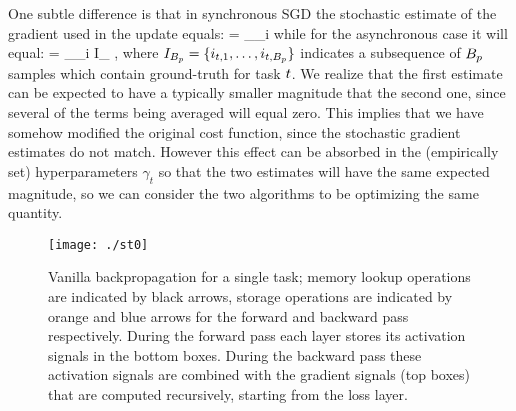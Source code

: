 \documentclass[10pt,twocolumn,letterpaper]{article}
\begin{document}
One subtle difference is that in synchronous SGD the stochastic estimate of the gradient used in the update equals:
\ba
{} = \gamma_{\task}\sum_{i \in \mb} \mydelta{\task}{\bi} \lossdd{\task}{\prd{\task}{\bi}(\prm{\cnn},\prm{\task})}{\gt{\task}{\bi}}{\prm{\mathrm{\task}}}\ea
while for the asynchronous case it will equal:
\ba
{} =
\gamma_{\task}\sum_{i \in I_{\bstask}}  \lossdd{\task}{\prd{\task}{\bi}(\prm{\cnn},\prm{\task})}{\gt{\task}{\bi}}{\prm{\mathrm{\task}}},\ea
where $I_{B_{p}} =\{i_{t,1},\ldots,i_{t,B_{p}}\}$ indicates a subsequence of $B_{p}$ samples which contain ground-truth for task $t$. We realize that the first estimate can be expected to have a typically smaller magnitude that the second one, since several of the terms being averaged will equal zero. This implies that we have somehow modified the original cost function, since the stochastic gradient estimates do not match.
However this effect can be absorbed in the (empirically set) hyperparameters $\gamma_t$ so that the two estimates will have the same expected magnitude, so we can consider the two algorithms to be optimizing the same quantity.  











\newcommand{\nlcnn}{L_{C}}
\newcommand{\nltask}{L_{T}}
\newcommand{\nbytes}{N}

\newcommand{\wdf}{.5\textwidth}
\begin{figure}[!h]
	\begin{center}
		\texttt{[image: ./st0]}
	\end{center}
	\caption{Vanilla backpropagation for a single task; memory lookup operations are indicated by black arrows, storage operations are indicated by orange and blue arrows for the forward and backward pass respectively.
		During the forward pass each layer stores its activation signals in the bottom boxes. During the backward pass these activation signals are  combined with the gradient signals (top boxes) that are  computed recursively, starting from the loss layer.  \label{fig:vanillasingle}}
\end{figure}
\end{document}
